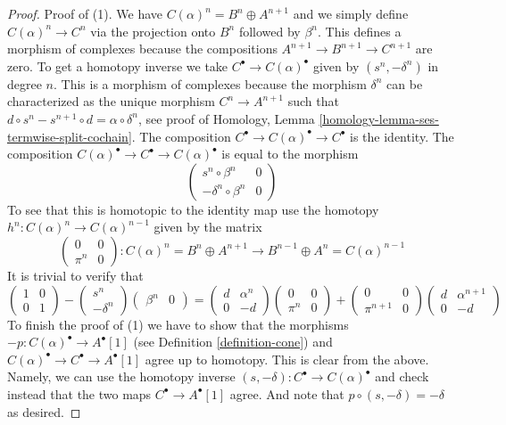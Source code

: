 \begin{proof}
Proof of (1). We have $C(\alpha)^n = B^n \oplus A^{n + 1}$
and we simply define $C(\alpha)^n \to C^n$ via the projection
onto $B^n$ followed by $\beta^n$. This defines
a morphism of complexes because the compositions
$A^{n + 1} \to B^{n + 1} \to C^{n + 1}$ are zero.
To get a homotopy inverse we take
$C^\bullet \to C(\alpha)^\bullet$ given by
$(s^n , -\delta^n)$ in degree $n$. This is a morphism of complexes
because the morphism $\delta^n$ can be characterized as the
unique morphism $C^n \to A^{n + 1}$ such that
$d \circ s^n - s^{n + 1} \circ d = \alpha \circ \delta^n$,
see proof of
Homology, Lemma \ref{homology-lemma-ses-termwise-split-cochain}.
The composition
$C^\bullet \to C(\alpha)^\bullet \to C^\bullet$ is the identity.
The composition $C(\alpha)^\bullet \to C^\bullet \to C(\alpha)^\bullet$
is equal to the morphism
$$
\left(
\begin{matrix}
s^n \circ \beta^n & 0 \\
-\delta^n \circ \beta^n & 0
\end{matrix}
\right)
$$
To see that this is homotopic to the identity map
use the homotopy $h^n : C(\alpha)^n \to C(\alpha)^{n - 1}$
given by the matrix
$$
\left(
\begin{matrix}
0 & 0 \\
\pi^n & 0
\end{matrix}
\right) : C(\alpha)^n = B^n \oplus A^{n + 1} \to
B^{n - 1} \oplus A^n = C(\alpha)^{n - 1}
$$
It is trivial to verify that
$$
\left(
\begin{matrix}
1 & 0 \\
0 & 1
\end{matrix}
\right)
-
\left(
\begin{matrix}
s^n \\
-\delta^n
\end{matrix}
\right)
\left(
\begin{matrix}
\beta^n & 0
\end{matrix}
\right)
=
\left(
\begin{matrix}
d & \alpha^n \\
0 & -d
\end{matrix}
\right)
\left(
\begin{matrix}
0 & 0 \\
\pi^n & 0
\end{matrix}
\right)
+
\left(
\begin{matrix}
0 & 0 \\
\pi^{n + 1} & 0
\end{matrix}
\right)
\left(
\begin{matrix}
d & \alpha^{n + 1} \\
0 & -d
\end{matrix}
\right)
$$
To finish the proof of (1) we have to show that the morphisms
$-p : C(\alpha)^\bullet \to A^\bullet[1]$ (see
Definition \ref{definition-cone})
and  $C(\alpha)^\bullet \to C^\bullet \to A^\bullet[1]$ agree up
to homotopy. This is clear from the above. Namely, we can use the homotopy
inverse $(s, -\delta) : C^\bullet \to C(\alpha)^\bullet$
and check instead that the two maps
$C^\bullet \to A^\bullet[1]$ agree. And note that
$p \circ (s, -\delta) = -\delta$ as desired.


\end{proof}
